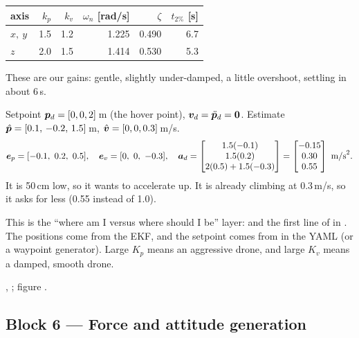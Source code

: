 \begin{center}\small
\begin{tabular}{@{}lrrrrr@{}}
\toprule
axis & $k_p$ & $k_v$ & $\omega_n$ [rad/s] & $\zeta$ & $t_{2\%}$ [s]\\
\midrule
$x,\ y$ & 1.5 & 1.2 & 1.225 & 0.490 & 6.7\\
$z$ & 2.0 & 1.5 & 1.414 & 0.530 & 5.3\\
\bottomrule
\end{tabular}
\end{center}
These are our  gains: gentle, slightly under-damped, a little overshoot, settling in about 6\,s.

\begin{toybox}
Setpoint $\bm{p}_d=[0,0,2]$\,m (the  hover point), $\bm{v}_d=\ddot{\bm{p}}_d=\bm0$.
Estimate $\hat{\bm p}=[0.1,\,-0.2,\,1.5]$\,m, $\hat{\bm v}=[0,0,0.3]$\,m/s.
\[
\ve_p=[-0.1,\ 0.2,\ 0.5],\quad \ve_v=[0,\ 0,\ -0.3],\quad
\va_d=\begin{bmatrix}1.5(-0.1)\\1.5(0.2)\\2(0.5)+1.5(-0.3)\end{bmatrix}=\begin{bmatrix}-0.15\\0.30\\0.55\end{bmatrix}\text{ m/s}^2 .
\]
It is 50\,cm low, so it wants to accelerate up. It is already climbing at 0.3\,m/s, so it asks for less (0.55 instead of 1.0).
\end{toybox}

\begin{projbox}
This is the ``where am I versus where should I be'' layer:  and the
first line of  in . The positions come from the EKF, and the setpoint
comes from  in the YAML (or a waypoint generator). Large $K_p$ means an aggressive drone, and large
$K_v$ means a damped, smooth drone.
\end{projbox}

\begin{codebox}
\intoy {}, ; figure .
\end{codebox}

\subsection{Block 6 --- Force and attitude generation}
\label{sec:m1b6}

